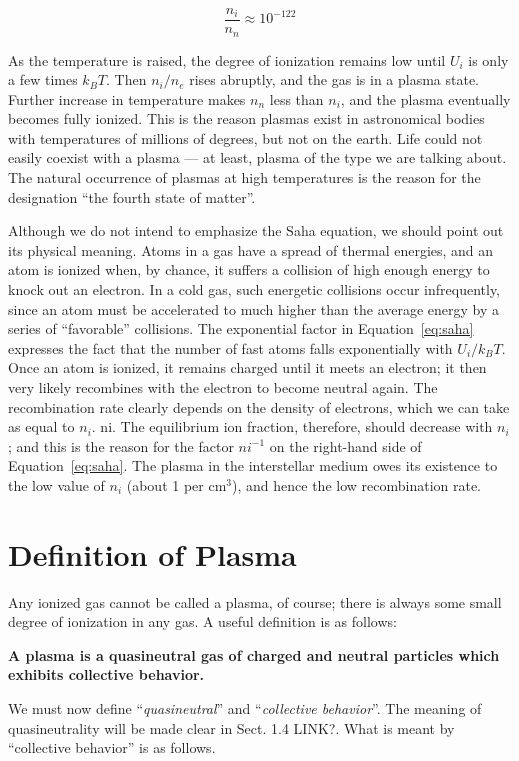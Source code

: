 \documentclass[
  notoc %
]{tufte-book}
\begin{document}
\[
\frac{n_i}{n_n}\approx 10^{-122}
\]

As the temperature is raised, the degree of ionization remains low until
\(U_i\) is only a few times \(k_B T\). Then \(n_i/n_e\) rises abruptly,
and the gas is in a plasma state. Further increase in temperature makes
\(n_n\) less than \(n_i\), and the plasma eventually becomes fully
ionized. This is the reason plasmas exist in astronomical bodies with
temperatures of millions of degrees, but not on the earth. Life could
not easily coexist with a plasma --- at least, plasma of the type we are
talking about. The natural occurrence of plasmas at high temperatures is
the reason for the designation ``the fourth state of matter''.

Although we do not intend to emphasize the Saha equation, we should
point out its physical meaning. Atoms in a gas have a spread of thermal
energies, and an atom is ionized when, by chance, it suffers a collision
of high enough energy to knock out an electron. In a cold gas, such
energetic collisions occur infrequently, since an atom must be
accelerated to much higher than the average energy by a series of
``favorable'' collisions. The exponential factor in
Equation~\ref{eq:saha} expresses the fact that the number of fast atoms
falls exponentially with \(U_i/k_BT\). Once an atom is ionized, it
remains charged until it meets an electron; it then very likely
recombines with the electron to become neutral again. The recombination
rate clearly depends on the density of electrons, which we can take as
equal to \(n_i\). ni. The equilibrium ion fraction, therefore, should
decrease with \(n_i\); and this is the reason for the factor \(ni^{-1}\)
on the right-hand side of Equation~\ref{eq:saha}. The plasma in the
interstellar medium owes its existence to the low value of \(n_i\)
(about 1 per \(\text{cm}^3\)), and hence the low recombination rate.

\hypertarget{definition-of-plasma}{%
\section{Definition of Plasma}\label{definition-of-plasma}}

Any ionized gas cannot be called a plasma, of course; there is always
some small degree of ionization in any gas. A useful definition is as
follows:

\textbf{A plasma is a quasineutral gas of charged and neutral particles
which exhibits collective behavior.}

We must now define ``\emph{quasineutral}'' and ``\emph{collective
behavior}''. The meaning of quasineutrality will be made clear in Sect.
1.4 LINK?. What is meant by ``collective behavior'' is as follows.
\end{document}

